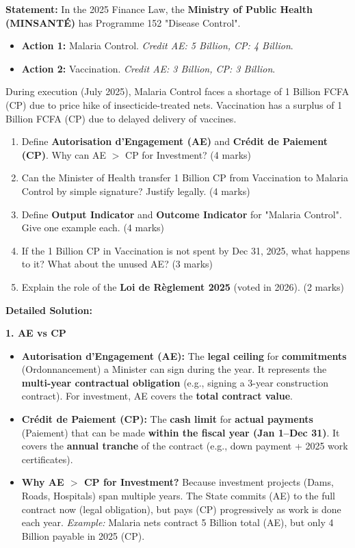 \documentclass[11pt]{article}
\begin{document}
\begin{exoresolu}
\textbf{Statement:}
In the 2025 Finance Law, the \textbf{Ministry of Public Health (MINSANTÉ)} has Programme 152 "Disease Control".
\begin{itemize}
    \item \textbf{Action 1:} Malaria Control. \textit{Credit AE: 5 Billion, CP: 4 Billion}.
    \item \textbf{Action 2:} Vaccination. \textit{Credit AE: 3 Billion, CP: 3 Billion}.
\end{itemize}
During execution (July 2025), Malaria Control faces a shortage of 1 Billion FCFA (CP) due to price hike of insecticide-treated nets. Vaccination has a surplus of 1 Billion FCFA (CP) due to delayed delivery of vaccines.
\begin{enumerate}
    \item Define \textbf{Autorisation d'Engagement (AE)} and \textbf{Crédit de Paiement (CP)}. Why can AE $>$ CP for Investment? (4 marks)
    \item Can the Minister of Health transfer 1 Billion CP from Vaccination to Malaria Control by simple signature? Justify legally. (4 marks)
    \item Define \textbf{Output Indicator} and \textbf{Outcome Indicator} for "Malaria Control". Give one example each. (4 marks)
    \item If the 1 Billion CP in Vaccination is not spent by Dec 31, 2025, what happens to it? What about the unused AE? (3 marks)
    \item Explain the role of the \textbf{Loi de Règlement 2025} (voted in 2026). (2 marks)
\end{enumerate}
\tcblower
\textbf{Detailed Solution:}

\textbf{1. AE vs CP}
\begin{itemize}
    \item \textbf{Autorisation d'Engagement (AE):} The \textbf{legal ceiling} for \textbf{commitments} (Ordonnancement) a Minister can sign during the year. It represents the \textbf{multi-year contractual obligation} (e.g., signing a 3-year construction contract). For investment, AE covers the \textbf{total contract value}.
    \item \textbf{Crédit de Paiement (CP):} The \textbf{cash limit} for \textbf{actual payments} (Paiement) that can be made \textbf{within the fiscal year (Jan 1--Dec 31)}. It covers the \textbf{annual tranche} of the contract (e.g., down payment + 2025 work certificates).
    \item \textbf{Why AE $>$ CP for Investment?} Because investment projects (Dams, Roads, Hospitals) span multiple years. The State commits (AE) to the full contract now (legal obligation), but pays (CP) progressively as work is done each year. \textit{Example:} Malaria nets contract 5 Billion total (AE), but only 4 Billion payable in 2025 (CP).
\end{itemize}


\end{exoresolu}
\end{document}
